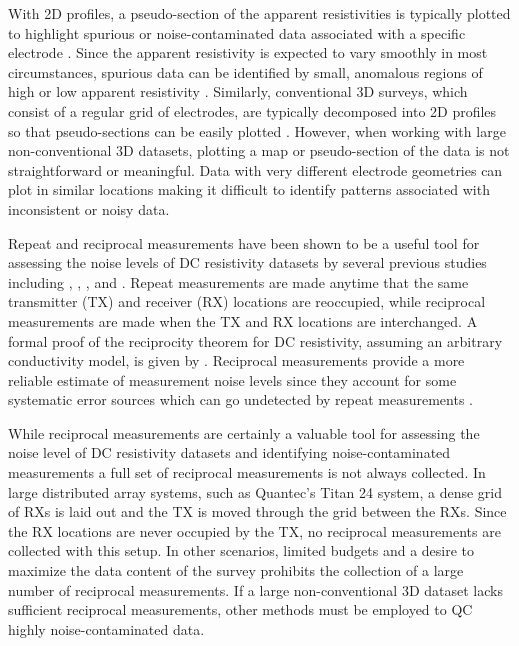 \documentclass[final,authoryear,5p,times,twocolumn]{elsarticle}
\begin{document}
With 2D profiles, a pseudo-section of the apparent resistivities is typically plotted to highlight spurious or noise-contaminated data associated with a specific electrode \citep{Edwards1977,Deceuster2013}. Since the apparent resistivity is expected to vary smoothly in most circumstances, spurious data can be identified by small, anomalous regions of high or low apparent resistivity \citep{Loke2000}. Similarly, conventional 3D surveys, which consist of a regular grid of electrodes, are typically decomposed into 2D profiles so that pseudo-sections can be easily plotted \citep{Auken2006}. However, when working with large non-conventional 3D datasets, plotting a map or pseudo-section of the data is not straightforward or meaningful. Data with very different electrode geometries can plot in similar locations making it difficult to identify patterns associated with inconsistent or noisy data.

Repeat and reciprocal measurements have been shown to be a useful tool for assessing the noise levels of DC resistivity datasets by several previous studies including \cite{LaBrecque1996}, \cite{Slater2000}, \cite{Zhou2003}, \cite{LaBrecque2008} and \cite{Wilkinson2012}. Repeat measurements are made anytime that the same transmitter (TX) and receiver (RX) locations are reoccupied, while reciprocal measurements are made when the TX and RX locations are interchanged. A formal proof of the reciprocity theorem for DC resistivity, assuming an arbitrary conductivity model, is given by \cite{Parasnis1988}. Reciprocal measurements provide a more reliable estimate of measurement noise levels since they account for some systematic error sources which can go undetected by repeat measurements \citep{LaBrecque1996}.

While reciprocal measurements are certainly a valuable tool for assessing the noise level of DC resistivity datasets and identifying noise-contaminated measurements a full set of reciprocal measurements is not always collected. In large distributed array systems, such as Quantec's Titan 24 system, a dense grid of RXs is laid out and the TX is moved through the grid between the RXs. Since the RX locations are never occupied by the TX, no reciprocal measurements are collected with this setup. In other scenarios, limited budgets and a desire to maximize the data content of the survey prohibits the collection of a large number of reciprocal measurements. If a large non-conventional 3D dataset lacks sufficient reciprocal measurements, other methods must be employed to QC highly noise-contaminated data.
\end{document}
